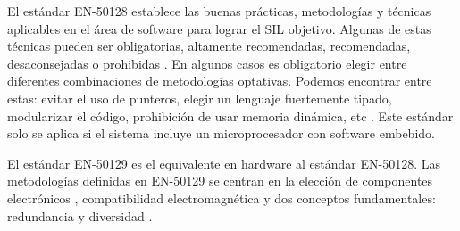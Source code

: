     \begin{table}[!h]
        {
        \caption{SIL en función de la Probabilidad de Fallas/Hora (PFH).}
        \label{Tab:tabla_SIL}
        \centering
            \begin{center}
            \end{center}
        }    
    \end{table}

    El estándar EN-50128 establece las buenas prácticas, metodologías y técnicas aplicables en el área de software para lograr el SIL objetivo. Algunas de estas técnicas pueden ser obligatorias, altamente recomendadas, recomendadas, desaconsejadas o prohibidas \cite{Paper_75,Paper_15,Paper_21,Paper_54,Paper_65}. En algunos casos es obligatorio elegir entre diferentes combinaciones de metodologías optativas. Podemos encontrar entre estas: evitar el uso de punteros, elegir un lenguaje fuertemente tipado, modularizar el código, prohibición de usar memoria dinámica, etc \cite{Paper_75}. Este estándar solo se aplica si el sistema incluye un microprocesador con software embebido.

    El estándar EN-50129 es el equivalente en hardware al estándar EN-50128. Las metodologías definidas en EN-50129 se centran en la elección de componentes electrónicos \cite{Paper_68,Paper_116,Paper_117,Paper_120,Paper_122,Paper_126}, compatibilidad electromagnética y dos conceptos fundamentales: redundancia \cite{Paper_23,Paper_29,Paper_32,Paper_42,Paper_49,Paper_97,Paper_98} y diversidad \cite{Paper_53,Paper_125,Paper_131,Paper_132,Paper_140,Paper_171}.

    